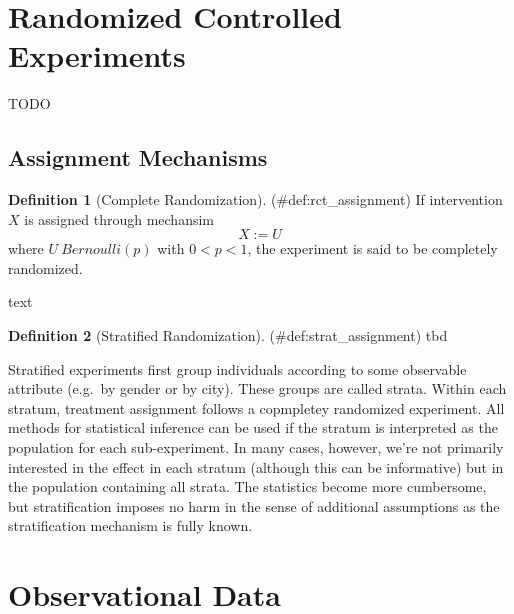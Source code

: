 \documentclass[
]{book}
\theoremstyle{definition}
\newtheorem{definition}{Definition}[chapter]
\theoremstyle{definition}
\theoremstyle{definition}
\theoremstyle{remark}
\begin{document}
\hypertarget{randomized-controlled-experiments}{%
\section{Randomized Controlled Experiments}\label{randomized-controlled-experiments}}

TODO

\hypertarget{assignment-mechanisms}{%
\subsection{Assignment Mechanisms}\label{assignment-mechanisms}}

\begin{definition}[Complete Randomization]
\protect\hypertarget{def:rct_assignment}{}{(\#def:rct\_assignment) {} }If intervention \(X\) is assigned through mechansim
\begin{equation}
X := U
\end{equation}
where \(U ~ Bernoulli(p)\) with \(0 < p < 1\), the experiment is said to be completely randomized.
\end{definition}

text

\begin{definition}[Stratified Randomization]
\protect\hypertarget{def:strat_assignment}{}{(\#def:strat\_assignment) {} }tbd
\end{definition}

Stratified experiments first group individuals according to some observable attribute (e.g.~by gender or by city). These groups are called strata. Within each stratum, treatment assignment follows a copmpletey randomized experiment. All methods for statistical inference can be used if the stratum is interpreted as the population for each sub-experiment. In many cases, however, we're not primarily interested in the effect in each stratum (although this can be informative) but in the population containing all strata. The statistics become more cumbersome, but stratification imposes no harm in the sense of additional assumptions as the stratification mechanism is fully known.

\hypertarget{observational-data}{%
\section{Observational Data}\label{observational-data}}
\end{document}
